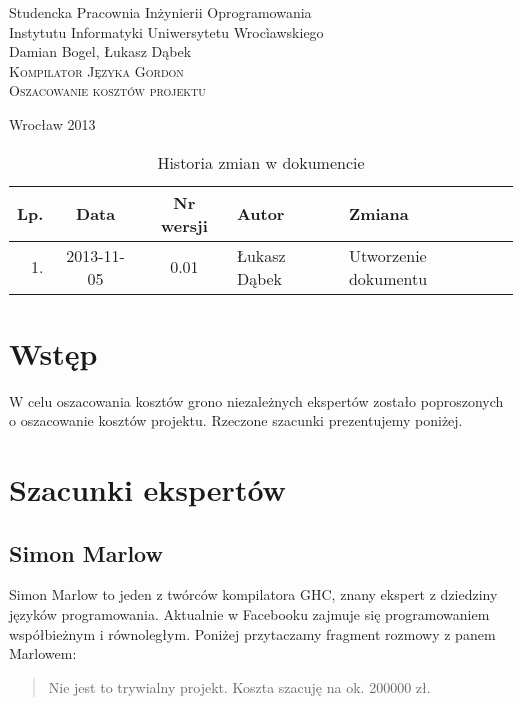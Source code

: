 \documentclass{documentation}
\begin{document}
\begin{titlepage}
\begin{center}
Studencka Pracownia Inżynierii Oprogramowania\\
Instytutu Informatyki Uniwersytetu Wrocìawskiego\\[6cm]

Damian Bogel, Łukasz Dąbek\\[1cm]
\textsc{\LARGE Kompilator Języka Gordon}\\[0.5cm]
\textsc{\large Oszacowanie kosztów projektu}

\vfill
Wrocław 2013 \\[2.5cm]

\end{center}
\end{titlepage}

\newpage
\begin{table}
	\centering
	\caption{Historia zmian w dokumencie}
		\begin{tabular}{|r|c|c|l|l|}
		\hline
		Lp.  & Data       & Nr wersji & Autor                 & Zmiana \\ \hline
		1.   & 2013-11-05 & 0.01 & Łukasz Dąbek & Utworzenie dokumentu \\ \hline
	\end{tabular}
\end{table}
\newpage

\tableofcontents
\setcounter{page}{2}

\newpage

\section{Wstęp}
\noindent W celu oszacowania kosztów grono niezależnych ekspertów zostało poproszonych
o oszacowanie kosztów projektu. Rzeczone szacunki prezentujemy poniżej.

\section{Szacunki ekspertów}
\subsection{Simon Marlow}
\noindent Simon Marlow to jeden z twórców kompilatora \textsc{GHC}, znany ekspert
z dziedziny języków programowania. Aktualnie w Facebooku zajmuje się programowaniem
współbieżnym i równoległym. Poniżej przytaczamy fragment rozmowy z panem Marlowem:
\begin{quotation}
    Nie jest to trywialny projekt. Koszta szacuję na ok. 200000 zł.
\end{quotation}
\end{document}
